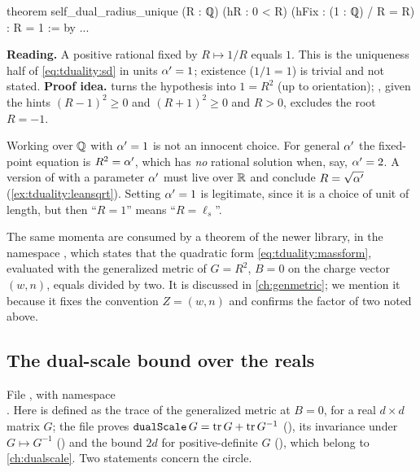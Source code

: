 \begin{leanbox}
\begin{leancode}
theorem self_dual_radius_unique (R : ℚ) (hR : 0 < R)
    (hFix : (1 : ℚ) / R = R) : R = 1 := by ...
\end{leancode}
\textbf{Reading.} A positive rational fixed by $R\mapsto1/R$ equals $1$. This is the
uniqueness half of \eqref{eq:tduality:sd} in units $\alpha'=1$; existence ($1/1=1$) is trivial and
not stated. \textbf{Proof idea.}  turns the hypothesis into $1=R^2$ (up to
orientation); , given the hints $(R-1)^2\ge0$ and $(R+1)^2\ge0$ and $R>0$, excludes
the root $R=-1$.
\end{leanbox}

\begin{pitfallbox}
Working over $\mathbb{Q}$ with $\alpha'=1$ is not an innocent choice. For general $\alpha'$ the fixed-point
equation is $R^2=\alpha'$, which has \emph{no} rational solution when, say, $\alpha'=2$. A version of
 with a parameter $\alpha'$ must live over $\mathbb{R}$ and conclude
$R=\sqrt{\alpha'}$ (\cref{ex:tduality:leansqrt}). Setting $\alpha'=1$ is legitimate, since it is a
choice of unit of length, but then ``$R=1$'' means ``$R=\ell_s$''.
\end{pitfallbox}

The same momenta are consumed by a theorem of the newer library,  in
the namespace , which states that the quadratic form
\eqref{eq:tduality:massform}, evaluated with the generalized metric of $G=R^2$, $B=0$ on the
charge vector $(w,n)$, equals  divided by two. It is discussed in
\cref{ch:genmetric}; we mention it because it fixes the convention $Z=(w,n)$ and confirms the
factor of two noted above.

\subsection{The dual-scale bound over the reals}

File , with namespace\\
. Here  is defined as the trace of the
generalized metric at $B=0$, for a real $d\times d$ matrix $G$; the file proves
$\texttt{dualScale}\,G=\operatorname{tr} G+\operatorname{tr} G^{-1}$ (), its invariance under
$G\mapsto G^{-1}$ () and the bound $2d$ for positive-definite $G$
(), which belong to \cref{ch:dualscale}. Two statements concern the circle.

